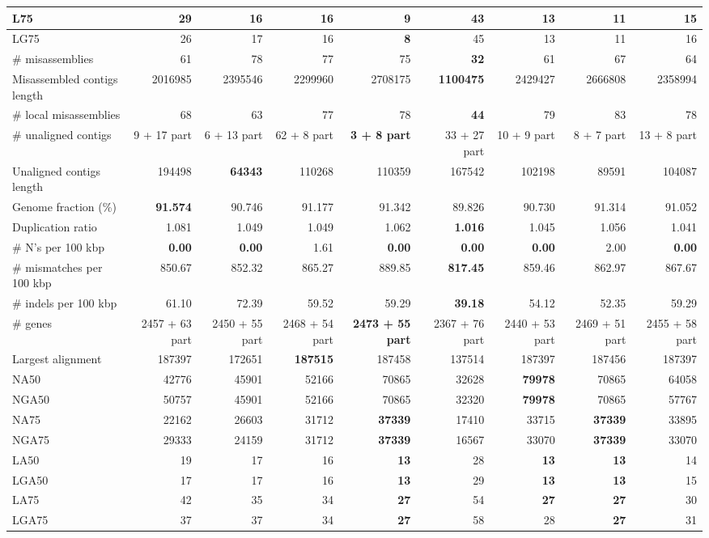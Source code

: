 \documentclass[12pt,a4paper]{article}
\begin{document}
\begin{table}[ht]
\begin{center}
\begin{tabular}{|l*{8}{|r}|}
L75 & 29 & 16 & 16 & {\bf 9} & 43 & 13 & 11 & 15 \\ \hline
LG75 & 26 & 17 & 16 & {\bf 8} & 45 & 13 & 11 & 16 \\ \hline
\# misassemblies & 61 & 78 & 77 & 75 & {\bf 32} & 61 & 67 & 64 \\ \hline
Misassembled contigs length & 2016985 & 2395546 & 2299960 & 2708175 & {\bf 1100475} & 2429427 & 2666808 & 2358994 \\ \hline
\# local misassemblies & 68 & 63 & 77 & 78 & {\bf 44} & 79 & 83 & 78 \\ \hline
\# unaligned contigs & 9 + 17 part & 6 + 13 part & 62 + 8 part & {\bf 3 + 8 part} & 33 + 27 part & 10 + 9 part & 8 + 7 part & 13 + 8 part \\ \hline
Unaligned contigs length & 194498 & {\bf 64343} & 110268 & 110359 & 167542 & 102198 & 89591 & 104087 \\ \hline
Genome fraction (\%) & {\bf 91.574} & 90.746 & 91.177 & 91.342 & 89.826 & 90.730 & 91.314 & 91.052 \\ \hline
Duplication ratio & 1.081 & 1.049 & 1.049 & 1.062 & {\bf 1.016} & 1.045 & 1.056 & 1.041 \\ \hline
\# N's per 100 kbp & {\bf 0.00} & {\bf 0.00} & 1.61 & {\bf 0.00} & {\bf 0.00} & {\bf 0.00} & 2.00 & {\bf 0.00} \\ \hline
\# mismatches per 100 kbp & 850.67 & 852.32 & 865.27 & 889.85 & {\bf 817.45} & 859.46 & 862.97 & 867.67 \\ \hline
\# indels per 100 kbp & 61.10 & 72.39 & 59.52 & 59.29 & {\bf 39.18} & 54.12 & 52.35 & 59.29 \\ \hline
\# genes & 2457 + 63 part & 2450 + 55 part & 2468 + 54 part & {\bf 2473 + 55 part} & 2367 + 76 part & 2440 + 53 part & 2469 + 51 part & 2455 + 58 part \\ \hline
Largest alignment & 187397 & 172651 & {\bf 187515} & 187458 & 137514 & 187397 & 187456 & 187397 \\ \hline
NA50 & 42776 & 45901 & 52166 & 70865 & 32628 & {\bf 79978} & 70865 & 64058 \\ \hline
NGA50 & 50757 & 45901 & 52166 & 70865 & 32320 & {\bf 79978} & 70865 & 57767 \\ \hline
NA75 & 22162 & 26603 & 31712 & {\bf 37339} & 17410 & 33715 & {\bf 37339} & 33895 \\ \hline
NGA75 & 29333 & 24159 & 31712 & {\bf 37339} & 16567 & 33070 & {\bf 37339} & 33070 \\ \hline
LA50 & 19 & 17 & 16 & {\bf 13} & 28 & {\bf 13} & {\bf 13} & 14 \\ \hline
LGA50 & 17 & 17 & 16 & {\bf 13} & 29 & {\bf 13} & {\bf 13} & 15 \\ \hline
LA75 & 42 & 35 & 34 & {\bf 27} & 54 & {\bf 27} & {\bf 27} & 30 \\ \hline
LGA75 & 37 & 37 & 34 & {\bf 27} & 58 & 28 & {\bf 27} & 31 \\ \hline
\end{tabular}
\end{center}
\end{table}
\end{document}
